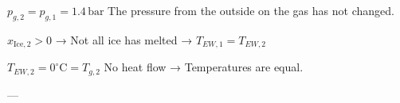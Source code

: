 \( p_{g,2} = p_{g,1} = 1.4 \, \text{bar} \)  
The pressure from the outside on the gas has not changed.  

\( x_{\text{Ice},2} > 0 \) → Not all ice has melted → \( T_{EW,1} = T_{EW,2} \)  

\( T_{EW,2} = 0^\circ \text{C} = T_{g,2} \)  
No heat flow → Temperatures are equal.  

---